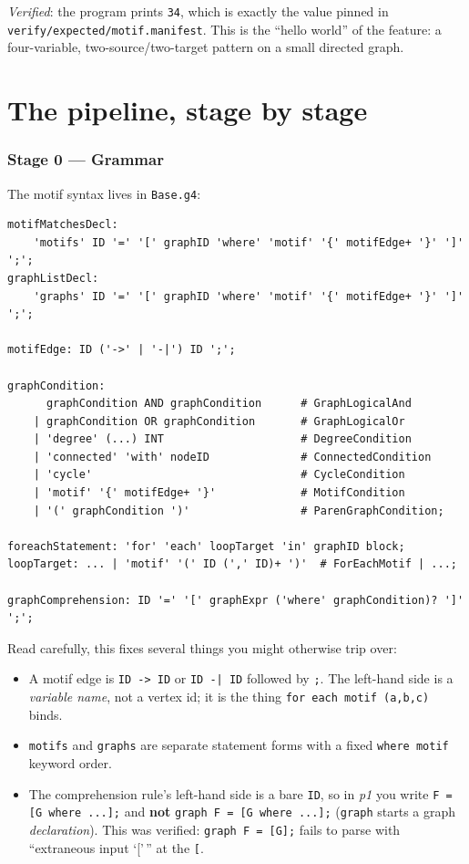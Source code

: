 \documentclass[11pt,a4paper]{article}
\newcommand{\code}[1]{\texttt{#1}}
\newcommand{\file}[1]{\texttt{#1}}
\begin{document}
\noindent\emph{Verified}: the program prints \code{34}, which is exactly the
value pinned in \file{verify/expected/motif.manifest}. This is the ``hello
world'' of the feature: a four-variable, two-source/two-target pattern on a small
directed graph.

\part{The pipeline, stage by stage}

\section{Stage 0 --- Grammar}
\label{sec:grammar}

The motif syntax lives in \file{Base.g4}:

\begin{lstlisting}[style=plain]
motifMatchesDecl:
    'motifs' ID '=' '[' graphID 'where' 'motif' '{' motifEdge+ '}' ']' ';';
graphListDecl:
    'graphs' ID '=' '[' graphID 'where' 'motif' '{' motifEdge+ '}' ']' ';';

motifEdge: ID ('->' | '-|') ID ';';

graphCondition:
      graphCondition AND graphCondition      # GraphLogicalAnd
    | graphCondition OR graphCondition       # GraphLogicalOr
    | 'degree' (...) INT                     # DegreeCondition
    | 'connected' 'with' nodeID              # ConnectedCondition
    | 'cycle'                                # CycleCondition
    | 'motif' '{' motifEdge+ '}'             # MotifCondition
    | '(' graphCondition ')'                 # ParenGraphCondition;

foreachStatement: 'for' 'each' loopTarget 'in' graphID block;
loopTarget: ... | 'motif' '(' ID (',' ID)+ ')'  # ForEachMotif | ...;

graphComprehension: ID '=' '[' graphExpr ('where' graphCondition)? ']' ';';
\end{lstlisting}

Read carefully, this fixes several things you might otherwise trip over:

\begin{itemize}
  \item A motif edge is \code{ID -> ID} or \code{ID -| ID} followed by
        \code{;}. The left-hand side is a \emph{variable name}, not a vertex id;
        it is the thing \code{for each motif (a,b,c)} binds.
  \item \code{motifs} and \code{graphs} are separate statement forms with a fixed
        \code{where motif} keyword order.
  \item The comprehension rule's left-hand side is a bare \code{ID}, so in
        \emph{p1} you write \code{F = [G where ...];} and \textbf{not}
        \code{graph F = [G where ...];} (\code{graph} starts a graph
        \emph{declaration}). This was verified: \code{graph F = [G];} fails to
        parse with ``extraneous input `['\,'' at the \code{[}.
\end{itemize}
\end{document}
